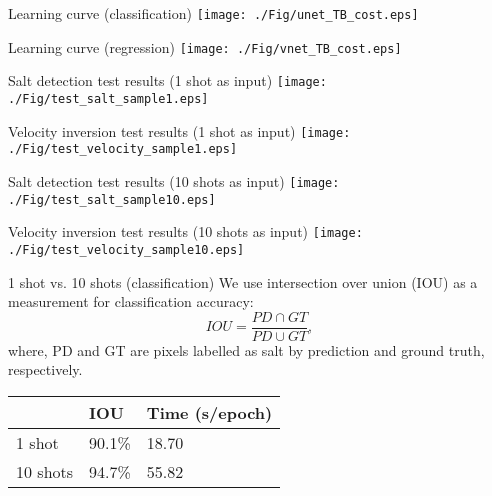 \documentclass[aspectratio=169]{beamer}
\begin{document}
\begin{frame}{Learning curve (classification)}
    \center
    \texttt{[image: ./Fig/unet\_TB\_cost.eps]}
\end{frame}
\begin{frame}{Learning curve (regression)}
    \center
    \texttt{[image: ./Fig/vnet\_TB\_cost.eps]}
\end{frame}
\begin{frame}{Salt detection test results (1 shot as input)}
    \center
    \texttt{[image: ./Fig/test\_salt\_sample1.eps]}
\end{frame}
\begin{frame}{Velocity inversion test results (1 shot as input)}
    \center
    \texttt{[image: ./Fig/test\_velocity\_sample1.eps]}
\end{frame}
\begin{frame}{Salt detection test results (10 shots as input)}
    \center
    \texttt{[image: ./Fig/test\_salt\_sample10.eps]}
\end{frame}
\begin{frame}{Velocity inversion test results (10 shots as input)}
    \center
    \texttt{[image: ./Fig/test\_velocity\_sample10.eps]}
\end{frame}
\begin{frame}{}
\end{frame}
\begin{frame}{}
\end{frame}
\begin{frame}{1 shot vs. 10 shots (classification)}
\noindent 
We use intersection over union (IOU) as a measurement for classification accuracy:
\begin{equation}
IOU=\frac{PD \cap GT}{PD \cup GT},
\end{equation}
where, PD and GT are pixels labelled as salt by prediction and ground truth, respectively.
\begin{table}[]
\centering
\label{Comparison}
\begin{tabular}{|l|l|l|}
\hline
         & IOU    & Time (s/epoch) \\ \hline
1 shot   & 90.1\% & 18.70          \\ \hline
10 shots & 94.7\% & 55.82          \\ \hline
\end{tabular}
\end{table}
\end{frame}
\end{document}
